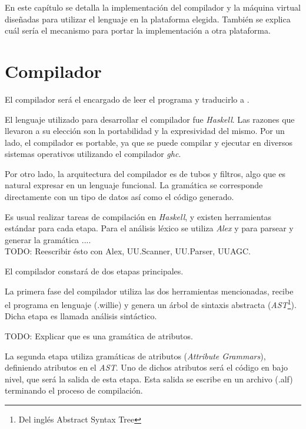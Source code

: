 
En este capítulo se detalla la implementación del compilador
y la máquina virtual diseñadas para utilizar el lenguaje
\frob{} en la plataforma elegida.
También se explica cuál sería el mecanismo para portar la
implementación a otra plataforma.


\section{Compilador}

  El compilador será el encargado de leer el programa \frob{} y traducirlo
a \alf{}.

  El lenguaje utilizado para desarrollar el compilador fue \textit{Haskell}.
Las razones que llevaron a su elección son la portabilidad y la expresividad
del mismo.
Por un lado, el compilador es portable, ya que se puede compilar y ejecutar
en diversos sistemas operativos utilizando el compilador \textit{ghc}.

  Por otro lado, la arquitectura del compilador es de tubos y filtros, algo
  que es natural expresar en un lenguaje funcional.
  La gramática se corresponde directamente con un tipo de datos así
  como el código generado.

  Es usual realizar tareas de compilación en \textit{Haskell}, y existen
herramientas estándar para cada etapa.
  Para el análisis léxico se utiliza \textit{Alex} \cite{alex} y
  para parsear y generar la gramática .... \cite{attributegrammars} \\

  TODO: Reescribir ésto con Alex, UU.Scanner, UU.Parser, UUAGC.

  El compilador constará de dos etapas principales.

  La primera fase del compilador utiliza las dos herramientas mencionadas,
recibe el programa en lenguaje \frob (.willie) y genera un árbol de
sintaxis abstracta (\emph{AST}\footnote{Del inglés Abstract Syntax Tree}).\\
  
  Dicha etapa es llamada análisis sintáctico.

  TODO: Explicar que es una gramática de atributos.

  La segunda etapa utiliza gramáticas de atributos 
(\emph{Attribute Grammars}), definiendo atributos en el \emph{AST}.
  Uno de dichos atributos será el código en bajo nivel, que será la salida
de esta etapa.
  Esta salida se escribe en un archivo (.alf) terminando el proceso
de compilación.

